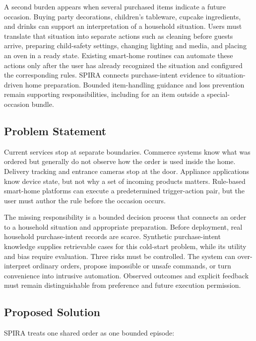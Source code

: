 \documentclass[conference]{IEEEtran}
\begin{document}
A second burden appears when several purchased items indicate a future occasion. Buying party decorations, children's tableware, cupcake ingredients, and drinks can support an interpretation of a household situation. Users must translate that situation into separate actions such as cleaning before guests arrive, preparing child-safety settings, changing lighting and media, and placing an oven in a ready state. Existing smart-home routines can automate these actions only after the user has already recognized the situation and configured the corresponding rules. SPIRA connects purchase-intent evidence to situation-driven home preparation. Bounded item-handling guidance and loss prevention remain supporting responsibilities, including for an item outside a special-occasion bundle.

\subsection{Problem Statement}
Current services stop at separate boundaries. Commerce systems know what was ordered but generally do not observe how the order is used inside the home. Delivery tracking and entrance cameras stop at the door. Appliance applications know device state, but not why a set of incoming products matters. Rule-based smart-home platforms can execute a predetermined trigger-action pair, but the user must author the rule before the occasion occurs.

The missing responsibility is a bounded decision process that connects an order to a household situation and appropriate preparation. Before deployment, real household purchase-intent records are scarce. Synthetic purchase-intent knowledge supplies retrievable cases for this cold-start problem, while its utility and bias require evaluation. Three risks must be controlled. The system can over-interpret ordinary orders, propose impossible or unsafe commands, or turn convenience into intrusive automation. Observed outcomes and explicit feedback must remain distinguishable from preference and future execution permission.

\subsection{Proposed Solution}
SPIRA treats one shared order as one bounded episode:
\end{document}
